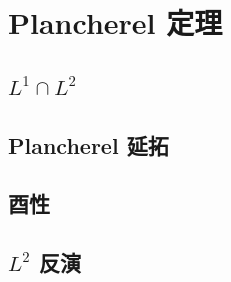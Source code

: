 \section{Plancherel 定理}
\label{b2:sec:0401}


\subsection{\texorpdfstring{\(L^1\cap L^2\)}{L12}}
\label{b2:subsec:040101}

\subsection{Plancherel 延拓}
\label{b2:subsec:040102}

\subsection{酉性}
\label{b2:subsec:040103}

\subsection{\texorpdfstring{\(L^2\)}{L2} 反演}
\label{b2:subsec:040104}


